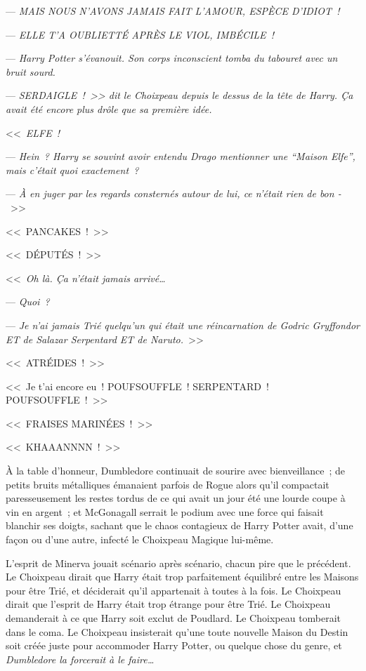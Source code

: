 {--- \emph{MAIS NOUS N'AVONS JAMAIS FAIT L'AMOUR, ESPÈCE D'IDIOT~!}

--- \emph{ELLE T'A OUBLIETTÉ APRÈS LE VIOL, IMBÉCILE~!}

--- \emph{Harry Potter s'évanouit. Son corps inconscient tomba du tabouret avec un bruit sourd.}

--- \emph{SERDAIGLE~!~>> dit le Choixpeau depuis le dessus de la tête de Harry. Ça avait été encore plus drôle que sa première idée.}

\later

<<~\emph{ELFE~!}

--- \emph{Hein~? Harry se souvint avoir entendu Drago mentionner une “Maison Elfe”, mais c'était quoi exactement~?}

--- \emph{À en juger par les regards consternés autour de lui, ce n'était rien de bon -}~>>

\later

<<~PANCAKES~!~>>

\later

<<~DÉPUTÉS~!~>>

\later

<<~\emph{Oh là. Ça n'était jamais arrivé…}

--- \emph{Quoi~?}

--- \emph{Je n'ai jamais Trié quelqu'un qui était une réincarnation de Godric Gryffondor ET de Salazar Serpentard ET de Naruto.}~>>

\later

<<~ATRÉIDES~!~>>

\later

<<~Je t'ai encore eu~! POUFSOUFFLE~! SERPENTARD~! POUFSOUFFLE~!~>>

\later

<<~FRAISES MARINÉES~!~>>

\later

<<~KHAAANNNN~!~>>

\later

À la table d'honneur, Dumbledore continuait de sourire avec bienveillance~; de petits bruits métalliques émanaient parfois de Rogue alors qu'il compactait paresseusement les restes tordus de ce qui avait un jour été une lourde coupe à vin en argent~; et McGonagall serrait le podium avec une force qui faisait blanchir ses doigts, sachant que le chaos contagieux de Harry Potter avait, d'une façon ou d'une autre, infecté le Choixpeau Magique lui-même.

L'esprit de Minerva jouait scénario après scénario, chacun pire que le précédent. Le Choixpeau dirait que Harry était trop parfaitement équilibré entre les Maisons pour être Trié, et déciderait qu'il appartenait à toutes à la fois. Le Choixpeau dirait que l'esprit de Harry était trop étrange pour être Trié. Le Choixpeau demanderait à ce que Harry soit exclut de Poudlard. Le Choixpeau tomberait dans le coma. Le Choixpeau insisterait qu'une toute nouvelle Maison du Destin soit créée juste pour accommoder Harry Potter, ou quelque chose du genre, et \emph{Dumbledore la forcerait à le faire…}

}
